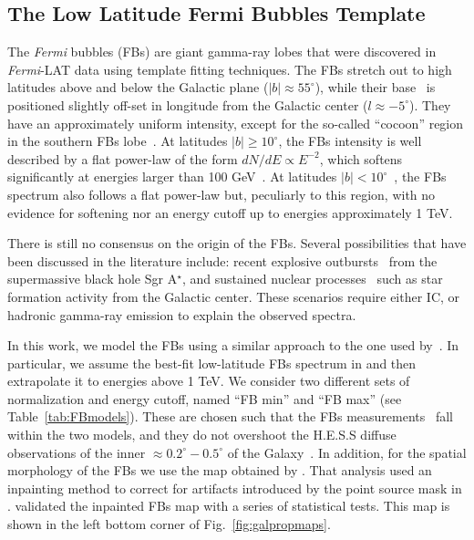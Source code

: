 \documentclass[doublespace,nopageskip]{VTthesis} %
\begin{document}
\subsection{The Low Latitude Fermi Bubbles Template}
\label{subsec:FBs}

The \textit{Fermi} bubbles (FBs) are giant gamma-ray lobes that were discovered in \textit{Fermi}-LAT data \citep{Su_etal:2010} using template fitting techniques. The FBs stretch out to high latitudes above and below the Galactic plane ($\lvert b \rvert \approx 55^\circ$), while their base~\citep{Herold:2019pei} is positioned slightly off-set in longitude from the Galactic center ($l\approx-5^\circ$). 
They have an approximately uniform intensity, except for the so-called ``cocoon'' region in the southern FBs lobe~\citep{Su_etal:2012, Fermi-bubbles:2014sfa}. At latitudes $\lvert b
\rvert \geq 10^\circ$, the FBs intensity is well described by a flat power-law of the form $dN/dE\propto E^{-2}$, which  softens significantly at energies larger than 100 GeV~\citep{Fermi-bubbles:2014sfa}. At latitudes $\lvert b \rvert < 10^\circ$~\citep{Acero:2016qlg,TheFermi-LAT:2017vmf,Storm:2017arh,Herold:2019pei}, the FBs spectrum also follows a flat power-law but, peculiarly to this region, with no evidence for softening nor an energy cutoff up to energies approximately 1 TeV. 

There is still no consensus on the origin of the FBs. Several possibilities that have been discussed in the literature include: recent explosive outbursts~\citep{Su_etal:2010} from the supermassive black hole Sgr A$^\star$, and sustained nuclear processes~\citep{Crocker:2014fla} such as star formation activity from the Galactic center. These scenarios require either IC, or hadronic gamma-ray emission to explain the observed spectra.

In this work, we model the FBs using a similar approach to the one used by~\cite{Rinchiuso:2020skh}. In particular, we assume the best-fit low-latitude FBs spectrum in \cite{TheFermi-LAT:2017vmf} and then extrapolate it to energies above 1 TeV. We consider two different sets of normalization and energy cutoff, named ``FB min'' and ``FB max'' (see Table~\ref{tab:FBmodels}). These are chosen such that the FBs measurements~\citep{TheFermi-LAT:2017vmf} fall within the two models, and they do not overshoot the H.E.S.S diffuse observations of the inner $\approx 0.2^\circ - 0.5^\circ$ of the Galaxy~\citep{Abramowski:2016mir}. In addition, for the spatial morphology of the FBs we use the map obtained by \citet{Macias:2019omb}. That analysis used an inpainting method to correct for artifacts introduced by the point source mask in \cite{TheFermi-LAT:2017vmf}. \cite{Macias:2019omb} validated the inpainted FBs map with a series of statistical tests. This map is shown in the left bottom corner of Fig.~\ref{fig:galpropmaps}.
\end{document}
